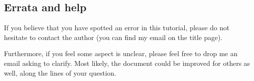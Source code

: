 \subsection*{Errata and help}
If you believe that you have spotted an error in this tutorial, please do not hesitate to contact the author (you can find my email on the title page).

Furthermore, if you feel some aspect is unclear, please feel free to drop me an email asking to clarify. Most likely, the document could be improved for others as well, along the lines of your question.